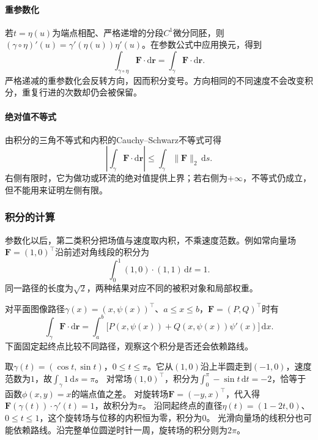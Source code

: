 \paragraph{重参数化}

若$t=\eta(u)$为端点相配、严格递增的分段$C^1$微分同胚，则
$(\gamma\circ\eta)'(u)=\gamma'(\eta(u))\eta'(u)$。在参数公式中应用换元，得到
\[
 \int_{\gamma\circ\eta}\bm F\cdot\mathrm d\bm r
 =\int_\gamma\bm F\cdot\mathrm d\bm r.
\]
严格递减的重参数化会反转方向，因而积分变号。方向相同的不同速度不会改变积分，重复行进的次数却仍会被保留。

\paragraph{绝对值不等式}

由积分的三角不等式和内积的Cauchy--Schwarz不等式可得
\[
 \left|\int_\gamma\bm F\cdot\mathrm d\bm r\right|
 \leq\int_\gamma\lVert\bm F\rVert_2\,\mathrm ds.
\]
右侧有限时，它为做功或环流的绝对值提供上界；若右侧为$+\infty$，不等式仍成立，但不能用来证明左侧有限。

\subsubsection{积分的计算}

参数化以后，第二类积分把场值与速度取内积，不乘速度范数。例如常向量场$\bm F=(1,0)^\top$沿前述对角线段的积分为
\[
 \int_0^1(1,0)\cdot(1,1)\,\mathrm dt=1.
\]
同一路径的长度为$\sqrt2$，两种结果对应不同的被积对象和局部权重。

对平面图像路径$\gamma(x)=(x,\psi(x))^\top$、$a\leq x\leq b$，$\bm F=(P,Q)^\top$时有
\[
 \int_\gamma\bm F\cdot\mathrm d\bm r
 =\int_a^b\bigl[P(x,\psi(x))+Q(x,\psi(x))\psi'(x)\bigr]\,\mathrm dx.
\]
下面固定起终点比较不同路径，观察这个积分是否还会依赖路线。

\begin{example}[半圆和直径]
\label{ex:analysis-path-integral-comparison}
取$\gamma(t)=(\cos t,\sin t)$，$0\leq t\leq\pi$。它从$(1,0)$沿上半圆走到$(-1,0)$，速度范数为$1$，故$\int_\gamma1\,\mathrm ds=\pi$。
对常场$(1,0)^\top$，积分为$\int_0^\pi-\sin t\,\mathrm dt=-2$，恰等于函数$\phi(x,y)=x$的端点值之差。
对旋转场$\bm F=(-y,x)^\top$，代入得$\bm F(\gamma(t))\cdot\gamma'(t)=1$，故积分为$\pi$。
沿同起终点的直径$\eta(t)=(1-2t,0)$、$0\leq t\leq1$，这个旋转场与位移的内积恒为零，积分为$0$。
光滑向量场的线积分也可能依赖路线。沿完整单位圆逆时针一周，旋转场的积分则为$2\pi$。
\end{example}


